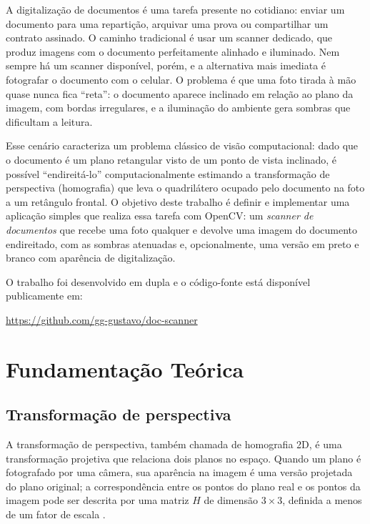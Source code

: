 \documentclass[conference]{IEEEtran}
\begin{document}
A digitalização de documentos é uma tarefa presente no cotidiano: enviar um documento para uma repartição, arquivar uma prova ou compartilhar um contrato assinado. O caminho tradicional é usar um scanner dedicado, que produz imagens com o documento perfeitamente alinhado e iluminado. Nem sempre há um scanner disponível, porém, e a alternativa mais imediata é fotografar o documento com o celular. O problema é que uma foto tirada à mão quase nunca fica ``reta'': o documento aparece inclinado em relação ao plano da imagem, com bordas irregulares, e a iluminação do ambiente gera sombras que dificultam a leitura.

Esse cenário caracteriza um problema clássico de visão computacional: dado que o documento é um plano retangular visto de um ponto de vista inclinado, é possível ``endireitá-lo'' computacionalmente estimando a transformação de perspectiva (homografia) que leva o quadrilátero ocupado pelo documento na foto a um retângulo frontal. O objetivo deste trabalho é definir e implementar uma aplicação simples que realiza essa tarefa com OpenCV: um \emph{scanner de documentos} que recebe uma foto qualquer e devolve uma imagem do documento endireitado, com as sombras atenuadas e, opcionalmente, uma versão em preto e branco com aparência de digitalização.

O trabalho foi desenvolvido em dupla e o código-fonte está disponível publicamente em:
\begin{center}
\url{https://github.com/gg-gustavo/doc-scanner}
\end{center}

\section{Fundamentação Teórica}

\subsection{Transformação de perspectiva}

A transformação de perspectiva, também chamada de homografia 2D, é uma transformação projetiva que relaciona dois planos no espaço. Quando um plano é fotografado por uma câmera, sua aparência na imagem é uma versão projetada do plano original; a correspondência entre os pontos do plano real e os pontos da imagem pode ser descrita por uma matriz $H$ de dimensão $3 \times 3$, definida a menos de um fator de escala \cite{hartley2004}.
\end{document}

